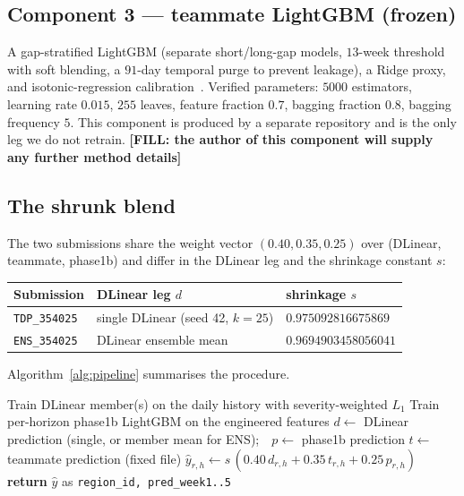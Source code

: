 \documentclass[11pt]{article}
\newcommand{\FILL}[1]{{\color{red}\textbf{[FILL: #1]}}}
\begin{document}
\subsection{Component 3 --- teammate LightGBM (frozen)}
A gap-stratified LightGBM (separate short/long-gap models, $13$-week threshold with soft blending,
a $91$-day temporal purge to prevent leakage), a Ridge proxy, and isotonic-regression
calibration~\citep{zadrozny2002isotonic}. Verified parameters: $5000$ estimators, learning rate
$0.015$, $255$ leaves, feature fraction $0.7$, bagging fraction $0.8$, bagging frequency $5$. This
component is produced by a separate repository and is the only leg we do not retrain.
\FILL{the author of this component will supply any further method details}

\subsection{The shrunk blend}
\label{sec:blendmath}
The two submissions share the weight vector $(0.40,0.35,0.25)$ over (DLinear, teammate, phase1b)
and differ in the DLinear leg and the shrinkage constant $s$:
\begin{center}
\begin{tabular}{lll}
\toprule
Submission & DLinear leg $d$ & shrinkage $s$ \\
\midrule
\texttt{TDP\_354025} & single DLinear (seed 42, $k{=}25$) & $0.975092816675869$ \\
\texttt{ENS\_354025} & DLinear ensemble mean              & $0.9694903458056041$ \\
\bottomrule
\end{tabular}
\end{center}
Algorithm~\ref{alg:pipeline} summarises the procedure.

\begin{algorithm}[t]
\caption{Train-and-blend}
\label{alg:pipeline}
\begin{algorithmic}[1]
\State Train DLinear member(s) on the daily history with severity-weighted $L_1$
\State Train per-horizon phase1b LightGBM on the engineered features
\State $d\gets$ DLinear prediction (single, or member mean for ENS);\ \ $p\gets$ phase1b prediction
\State $t\gets$ teammate prediction (fixed file)
  \State $\hat y_{r,h}\gets s\,(0.40\,d_{r,h}+0.35\,t_{r,h}+0.25\,p_{r,h})$
\EndFor
\State \textbf{return} $\hat y$ as \texttt{region\_id, pred\_week1..5}
\end{algorithmic}
\end{algorithm}
\end{document}
